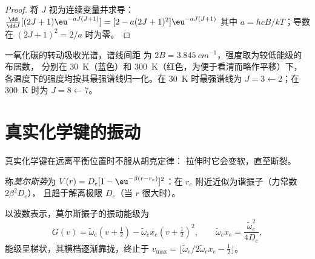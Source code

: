 \begin{proof}
将 $J$ 视为连续变量并求导：$\frac{\dd}{\dd J}[(2J+1)\eu^{-aJ(J+1)}]
= [2 - a(2J+1)^2]\eu^{-aJ(J+1)}$ 其中 $a = hcB/kT$；导数在 $(2J + 1)^2 =
2/a$ 时为零。
\end{proof}

\begin{omfigure}

{\small 一氧化碳的转动吸收光谱，谱线间距
为 $2B = \qty{3.845}{cm^{-1}}$，强度取为较低能级的布居数，
分别在 \qty{30}{K}（蓝色）和 \qty{300}{K}（红色，为便于看清而略作平移）下，
各温度下的强度均按其最强谱线归一化。在 \qty{30}{K} 时最强谱线为
$J = 3 \leftarrow 2$；在 \qty{300}{K} 时为 $J = 8 \leftarrow 7$。}
\end{omfigure}

\section{真实化学键的振动}\label{sec:b3:rovibrational-spectroscopy:real-bonds}

真实化学键在远离平衡位置时不服从胡克定律：
拉伸时它会变软，直至断裂。

\begin{definition}[莫尔斯势]\label{def:b3:rovibrational-spectroscopy:morse}
称\emph{莫尔斯势}为 $V(r) = D_e[1 -
\eu^{-\beta(r - r_e)}]^2$：在 $r_e$ 附近近似为谐振子（力常数 $2\beta^2D_e$），
且趋于解离极限 $D_e$（当 $r$ 很大时）。
\end{definition}

\begin{proposition}[莫尔斯振子的能级]\label{prop:b3:rovibrational-spectroscopy:morse-levels}
以波数表示，莫尔斯振子的振动能级为
\[
G(v) = \tilde\omega_e(v + \tfrac12) - \tilde\omega_ex_e(v + \tfrac12)^2, \qquad
\tilde\omega_ex_e = \frac{\tilde\omega_e^2}{4D_e},
\]
能级呈梯状，其横档逐渐靠拢，终止于 $v_{\max} = \lfloor\tilde\omega_e/
2\tilde\omega_ex_e - \frac12\rfloor$。
\end{proposition}
\admitted

